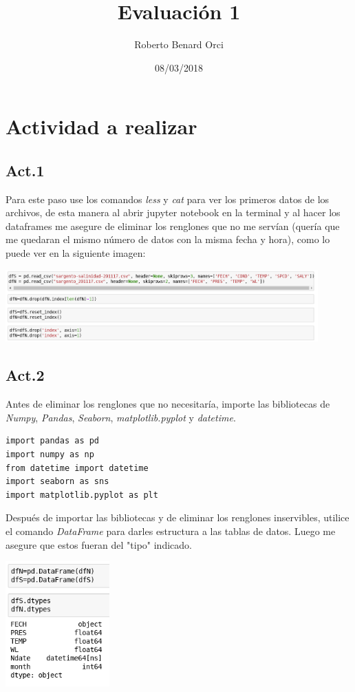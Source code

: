 \documentclass{article}
\title{Evaluación 1}
\author{Roberto Benard Orci}
\date{08/03/2018}
\begin{document}
\maketitle

\section*{Actividad a realizar}

\subsection*{Act.1}
Para este paso use los comandos \textit{less} y \textit{cat} para ver los primeros datos de los archivos, de esta manera al abrir jupyter notebook en la terminal y al hacer los dataframes me asegure de eliminar los renglones que no me servían (quería que me quedaran el mismo número de datos con la misma fecha y hora), como lo puede ver en la siguiente imagen:

\begin{center}
	\includegraphics[width=12cm]{ElimDeRyC.png}
    
\end{center}
\vspace{0.2cm}

\subsection*{Act.2}
Antes de eliminar los renglones que no necesitaría, importe las bibliotecas de \textit{Numpy}, \textit{Pandas}, \textit{Seaborn}, \textit{matplotlib.pyplot} y \textit{datetime}.

\begin{verbatim}
import pandas as pd
import numpy as np
from datetime import datetime
import seaborn as sns
import matplotlib.pyplot as plt
\end{verbatim}

Después de importar las bibliotecas y de eliminar los renglones inservibles, utilice el comando \textit{DataFrame} para darles estructura a las tablas de datos. Luego me asegure que estos fueran del "tipo" indicado.

\begin{center}
	\includegraphics[width=4cm]{Dataframe.png}
    
\end{center}
\vspace{0.2cm}
\end{document}
